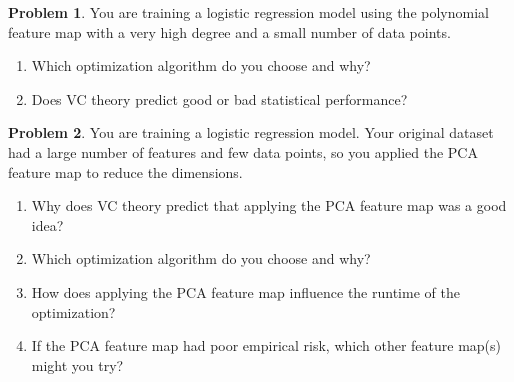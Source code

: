 \documentclass[10pt]{exam}
\theoremstyle{definition}
\newtheorem{problem}{Problem}
\begin{document}
\begin{problem}
    You are training a logistic regression model using the polynomial feature map with a very high degree and a small number of data points.
    \begin{enumerate}
        \item
            Which optimization algorithm do you choose and why?
            \vspace{4in}
        \item
            Does VC theory predict good or bad statistical performance?
    \end{enumerate}
\end{problem}

\newpage
\begin{problem}
    You are training a logistic regression model.
    Your original dataset had a large number of features and few data points,
    so you applied the PCA feature map to reduce the dimensions.

    \begin{enumerate}
        \item
            Why does VC theory predict that applying the PCA feature map was a good idea?
            \vspace{2in}
        \item
            Which optimization algorithm do you choose and why?
            \vspace{2in}
        \item
            How does applying the PCA feature map influence the runtime of the optimization?
            \vspace{2in}
        \item
            If the PCA feature map had poor empirical risk, which other feature map(s) might you try?
    \end{enumerate}
\end{problem}
\end{document}
